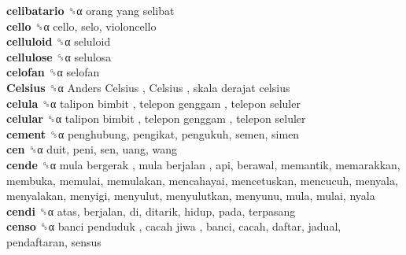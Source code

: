 \textbf{celibatario} ␝α   orang yang selibat   \\
\textbf{cello} ␝α  cello, selo, violoncello  \\
\textbf{celluloid} ␝α  seluloid  \\
\textbf{cellulose} ␝α  selulosa  \\
\textbf{celofan} ␝α  selofan  \\
\textbf{Celsius} ␝α   Anders Celsius ,  Celsius ,  skala derajat celsius   \\
\textbf{celula} ␝α   talipon bimbit ,  telepon genggam ,  telepon seluler   \\
\textbf{celular} ␝α   talipon bimbit ,  telepon genggam ,  telepon seluler   \\
\textbf{cement} ␝α  penghubung, pengikat, pengukuh, semen, simen  \\
\textbf{cen} ␝α  duit, peni, sen, uang, wang  \\
\textbf{cende} ␝α   mula bergerak ,  mula berjalan , api, berawal, memantik, memarakkan, membuka, memulai, memulakan, mencahayai, mencetuskan, mencucuh, menyala, menyalakan, menyigi, menyulut, menyulutkan, menyunu, mula, mulai, nyala  \\
\textbf{cendi} ␝α  atas, berjalan, di, ditarik, hidup, pada, terpasang  \\
\textbf{censo} ␝α   banci penduduk ,  cacah jiwa , banci, cacah, daftar, jadual, pendaftaran, sensus  \\
